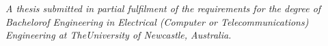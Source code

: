 \begin{titlepage}
    \vfill
    
    \emph{A thesis submitted in partial fulfilment of the requirements for the degree of Bachelorof Engineering in Electrical (Computer or Telecommunications) Engineering at TheUniversity of Newcastle, Australia.}
    
    \vfill
\end{titlepage}

